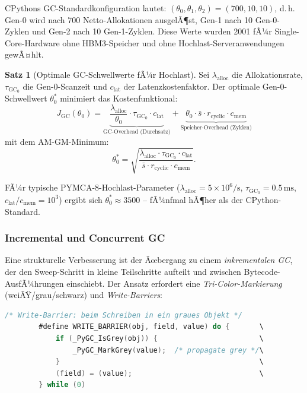 ﻿\documentclass[a4paper,12pt]{scrreprt}
\theoremstyle{definition}
\newtheorem{satz}{Satz}[section]
\begin{document}
	CPythons GC-Standardkonfiguration lautet:
	$(\theta_0, \theta_1, \theta_2) = (700, 10, 10)$, d.\,h. Gen-0
	wird nach 700 Netto-Allokationen ausgelÃ¶st, Gen-1 nach 10 Gen-0-Zyklen
	und Gen-2 nach 10 Gen-1-Zyklen. Diese Werte wurden 2001 fÃ¼r
	Single-Core-Hardware ohne HBM3-Speicher und ohne Hochlast-Serveranwendungen
	gewÃ¤hlt.
	
	\begin{satz}[Optimale GC-Schwellwerte fÃ¼r Hochlast]
		\label{satz:gc_thresholds}
		Sei $\lambda_{\mathrm{alloc}}$ die Allokationsrate,
		$\tau_{\mathrm{GC}_0}$ die Gen-0-Scanzeit und $c_{\mathrm{lat}}$ der
		Latenzkostenfaktor. Der optimale Gen-0-Schwellwert $\theta_0^*$
		minimiert das Kostenfunktional:
		\[
		J_{\mathrm{GC}}(\theta_0) = \underbrace{\frac{\lambda_{\mathrm{alloc}}}{\theta_0}
			\cdot \tau_{\mathrm{GC}_0} \cdot c_{\mathrm{lat}}}_{\text{GC-Overhead (Durchsatz)}}
		+ \underbrace{\theta_0 \cdot \bar{s} \cdot r_{\mathrm{cyclic}}
			\cdot c_{\mathrm{mem}}}_{\text{Speicher-Overhead (Zyklen)}}
		\]
		mit dem AM-GM-Minimum:
		\[
		\theta_0^* = \sqrt{\frac{\lambda_{\mathrm{alloc}} \cdot \tau_{\mathrm{GC}_0}
				\cdot c_{\mathrm{lat}}}{\bar{s} \cdot r_{\mathrm{cyclic}} \cdot c_{\mathrm{mem}}}}.
		\]
	\end{satz}
	
	FÃ¼r typische PYMCA-8-Hochlast-Parameter ($\lambda_{\mathrm{alloc}}
	= 5 \times 10^6/\mathrm{s}$, $\tau_{\mathrm{GC}_0} = 0.5\,\mathrm{ms}$,
	$c_{\mathrm{lat}}/c_{\mathrm{mem}} = 10^3$) ergibt sich
	$\theta_0^* \approx 3500$ -- fÃ¼nfmal hÃ¶her als der CPython-Standard.
	
	\subsubsection{Incremental und Concurrent GC}
	
	Eine strukturelle Verbesserung ist der Ãœbergang zu einem
	\emph{inkrementalen GC}, der den Sweep-Schritt in kleine
	Teilschritte aufteilt und zwischen Bytecode-AusfÃ¼hrungen einschiebt.
	Der Ansatz erfordert eine \emph{Tri-Color-Markierung} (weiÃŸ/grau/schwarz)
	und \emph{Write-Barriers}:
	
	\begin{lstlisting}[language=C, caption={Inkrementaler GC: Write-Barrier fuer Tri-Color},
		label=lst:incr_gc]
		/* Write-Barrier: beim Schreiben in ein graues Objekt */
		#define WRITE_BARRIER(obj, field, value) do {       \
			if (_PyGC_IsGrey(obj)) {                        \
				_PyGC_MarkGrey(value);  /* propagate grey */\
			}                                               \
			(field) = (value);                              \
		} while (0)
	\end{lstlisting}
	
\end{document}
